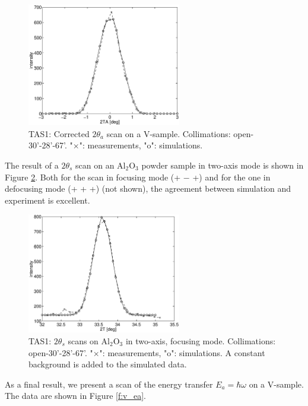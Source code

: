 \begin{figure}
  \begin{center}
    \includegraphics[width=0.6\textwidth]{figures/vanadium-plot-2.eps}
  \end{center}
\caption{TAS1: Corrected $2\theta_a$ scan on a V-sample.
Collimations: open-30'-28'-67'.
"$\times$": measurements, "o": simulations.}
\label{f:v_2ta_zero}
\end{figure}

The result of a $2\theta_s$ scan on an Al$_2$O$_3$
powder sample in two-axis mode is shown in Figure \ref{f:al2o3}.
Both for the scan in focusing mode (+ $-$ +)
and for the one in defocusing mode (+ + +) (not shown),
the agreement between simulation and experiment is excellent.

\begin{figure}
  \begin{center}
    \includegraphics[width=0.6\textwidth]{figures/al2o3-focus.eps}
  \end{center}
\caption{TAS1: $2\theta_s$ scans on Al$_2$O$_3$ in two-axis, focusing mode.
Collimations: open-30'-28'-67'.
"$\times$": measurements, "o": simulations.
A constant background is added to the simulated data.}
\label{f:al2o3}
\end{figure}

As a final result, we present a scan of the energy
transfer $E_a = \hbar \omega$ on a V-sample.
The data are shown in Figure \ref{f:v_ea}.

